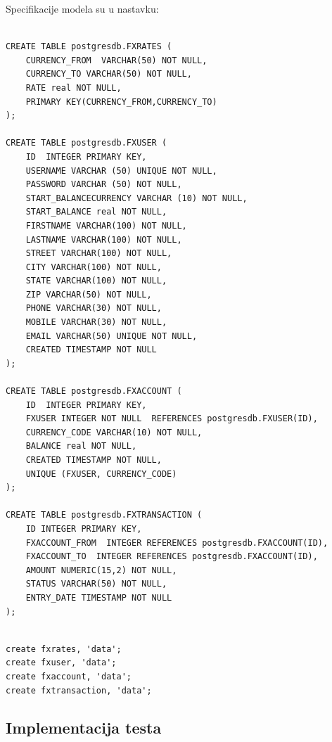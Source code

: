 \documentclass[12pt,oneside]{memoir}
\begin{document}
Specifikacije modela su u nastavku:


\begin{lstlisting}[title={setup-postgres-model.sql},captionpos=t]

CREATE TABLE postgresdb.FXRATES (
	CURRENCY_FROM  VARCHAR(50) NOT NULL,
	CURRENCY_TO VARCHAR(50) NOT NULL,
	RATE real NOT NULL,
	PRIMARY KEY(CURRENCY_FROM,CURRENCY_TO)
);

CREATE TABLE postgresdb.FXUSER (
	ID  INTEGER PRIMARY KEY,
	USERNAME VARCHAR (50) UNIQUE NOT NULL,
	PASSWORD VARCHAR (50) NOT NULL,
	START_BALANCECURRENCY VARCHAR (10) NOT NULL,
	START_BALANCE real NOT NULL,
	FIRSTNAME VARCHAR(100) NOT NULL,
	LASTNAME VARCHAR(100) NOT NULL,
	STREET VARCHAR(100) NOT NULL,
	CITY VARCHAR(100) NOT NULL,
	STATE VARCHAR(100) NOT NULL,
	ZIP VARCHAR(50) NOT NULL,
	PHONE VARCHAR(30) NOT NULL,
	MOBILE VARCHAR(30) NOT NULL,
	EMAIL VARCHAR(50) UNIQUE NOT NULL,
	CREATED TIMESTAMP NOT NULL
);

CREATE TABLE postgresdb.FXACCOUNT (
	ID  INTEGER PRIMARY KEY,
	FXUSER INTEGER NOT NULL  REFERENCES postgresdb.FXUSER(ID),
	CURRENCY_CODE VARCHAR(10) NOT NULL,
	BALANCE real NOT NULL,
	CREATED TIMESTAMP NOT NULL,
	UNIQUE (FXUSER, CURRENCY_CODE)
);

CREATE TABLE postgresdb.FXTRANSACTION (
	ID INTEGER PRIMARY KEY,
	FXACCOUNT_FROM  INTEGER REFERENCES postgresdb.FXACCOUNT(ID),
	FXACCOUNT_TO  INTEGER REFERENCES postgresdb.FXACCOUNT(ID),
	AMOUNT NUMERIC(15,2) NOT NULL,
	STATUS VARCHAR(50) NOT NULL,
	ENTRY_DATE TIMESTAMP NOT NULL
);


\end{lstlisting}


\begin{lstlisting}[title={setup-hbase-model.sh},captionpos=t]
create fxrates, 'data';
create fxuser, 'data';
create fxaccount, 'data';
create fxtransaction, 'data';
\end{lstlisting}

\subsection{Implementacija testa}
\end{document}
